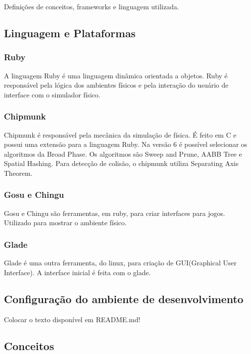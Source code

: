 Definições de conceitos, frameworks e linguagem utilizada.

\subsection{Linguagem e Plataformas}

\subsubsection{Ruby}

A linguagem Ruby é uma linguagem dinâmica orientada a objetos. Ruby é responsável pela lógica dos ambientes físicos e pela interação do usuário de interface com
o simulador físico.

\subsubsection{Chipmunk}

Chipmunk é responsável pela mecânica da simulação de física. É feito em C e possui uma extensão para a linguagem Ruby. Na versão 6 é possível selecionar
os algoritmos da Broad Phase. Os algoritmos são Sweep and Prune, AABB Tree e Spatial Hashing. Para detecção de colisão, o chipmunk utiliza Separating Axis Theorem.

\subsubsection{Gosu e Chingu}

Gosu e Chingu são ferramentas, em ruby, para criar interfaces para jogos. Utilizado para mostrar o ambiente físico.

\subsubsection{Glade}

Glade é uma outra ferramenta, do linux, para criação de GUI(Graphical User Interface). A interface inicial é feita com o glade.

\subsection{Configuração do ambiente de desenvolvimento}

Colocar o texto disponível em README.md!

\subsection{Conceitos}

